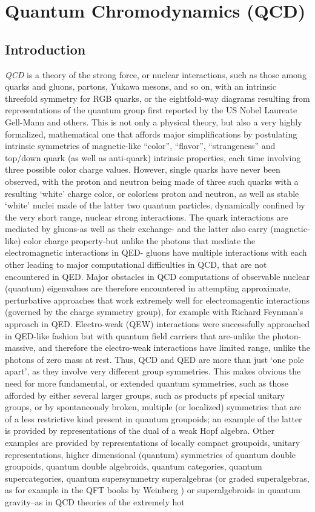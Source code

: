 \documentclass[12pt]{article}
\theoremstyle{plain}
\theoremstyle{definition}
\numberwithin{equation}{section}
\begin{document}
\section{Quantum Chromodynamics (QCD)} 

\subsection{Introduction}
 \emph{QCD} is a theory of the strong force, or nuclear interactions, such as those among quarks and gluons, partons, Yukawa mesons, and so on, with an intrinsic threefold symmetry for RGB quarks, or the eightfold-way diagrams resulting from representations of the quantum group first reported by the US Nobel Laureate Gell-Mann and others. This is not only a physical theory, but also a very highly formalized, mathematical one that affords major simplifications by postulating intrinsic symmetries of magnetic-like ``color'', ``flavor'', ``strangeness'' and top/down quark (as well as anti-quark) intrinsic properties, each time involving three possible color charge values. However, single quarks have never been observed, with the proton and neutron being made of three such quarks with a resulting `white' charge color, or colorless proton and neutron, as well as stable `white' nuclei made of the latter two quantum particles, dynamically confined by the very short range, nuclear strong interactions. The quark interactions are mediated by gluons-as well as their exchange- and the latter also carry (magnetic-like) color charge property-but unlike the photons that mediate the electromagnetic interactions in QED- gluons have multiple interactions with each other leading to major computational difficulties in QCD, that are not encountered in QED. Major obstacles in QCD computations of observable nuclear (quantum) eigenvalues are therefore encountered in attempting approximate, perturbative approaches that work extremely well for electromagentic interactions (governed by the charge  symmetry group), for example with Richard Feynman's approach in QED. Electro-weak (QEW) interactions were successfully approached in QED-like fashion but with quantum field carriers that are-unlike the photon-massive, and therefore the electro-weak interactions have limited range, unlike the photons of zero mass at rest. Thus, QCD and QED are more than just `one pole apart', as they involve very different group symmetries. This makes obvious the need for more fundamental, or extended quantum symmetries, such as those afforded by either several larger groups, such as products pf special unitary groups, or by spontaneously broken, multiple (or localized) symmetries that are of a less restrictive kind present in quantum groupoids; an example of the latter is provided by representations of the dual of a weak Hopf algebra. Other examples are provided by representations of locally compact groupoids, unitary representations, higher dimensional (quantum) symmetries of quantum double groupoids, quantum double algebroids, quantum categories, quantum supercategories, quantum supersymmetry superalgebras (or graded superalgebras, as for example in the QFT books by Weinberg \cite{WS2k3}) or superalgebroids in quantum gravity--as in QCD theories of the extremely hot 
\end{document}
